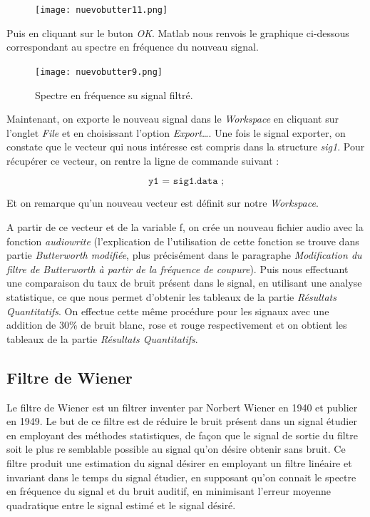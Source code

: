 \documentclass[conference,onecolumn]{IEEEtran}
\begin{document}
\begin{figure}[H]
 \centering
    \texttt{[image: nuevobutter11.png]}
\end{figure}

Puis en cliquant sur le buton \textit{OK}. Matlab nous renvois le graphique ci-dessous correspondant au spectre en fréquence du nouveau signal.

\begin{figure}[H]
 \centering
    \texttt{[image: nuevobutter9.png]}
    \caption{Spectre en fréquence su signal filtré.}
\end{figure}

Maintenant, on exporte le nouveau signal dans le \textit{Workspace} en cliquant sur l’onglet \textit{File} et en choisissant l’option \textit{Export…}. Une fois le signal exporter, on constate que le vecteur qui nous intéresse est compris dans la structure \textit{sig1}. Pour récupérer ce vecteur, on rentre la ligne de commande suivant :

\[\texttt{y1 = sig1.data ;}\]

Et on remarque qu’un nouveau vecteur est définit sur notre \textit{Workspace}. 

A partir de ce vecteur et de la variable f, on crée un nouveau fichier audio avec la fonction \textit{audiowrite} (l’explication de l’utilisation de cette fonction se trouve dans partie  \textit{Butterworth modifiée}, plus précisément dans le paragraphe \textit{ Modification du filtre de Butterworth à partir de la fréquence de coupure}). Puis nous effectuant une comparaison du taux de bruit présent dans le signal, en utilisant une analyse statistique, ce que nous permet d’obtenir les tableaux de la partie \textit{Résultats Quantitatifs}. On effectue cette même procédure pour les signaux avec une addition de 30\% de bruit blanc, rose et rouge respectivement et on obtient les tableaux de la partie \textit{Résultats Quantitatifs}.


\subsection{\textbf{Filtre de Wiener}}

Le filtre de Wiener est un filtrer inventer par Norbert Wiener en 1940 et publier en 1949. Le but de ce filtre est de réduire le bruit présent dans un signal étudier en employant des méthodes statistiques, de façon que le signal de sortie du filtre soit le plus re semblable possible au signal qu’on désire obtenir sans bruit. Ce filtre produit une estimation du signal désirer en employant un filtre linéaire et invariant dans le temps du signal étudier, en supposant qu’on connait le spectre en fréquence du signal et du bruit auditif, en minimisant l’erreur moyenne quadratique entre le signal estimé et le signal désiré. 
\end{document}
